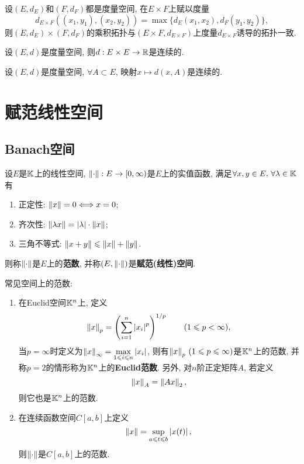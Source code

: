 	\begin{Remark}
	设$ (E,d_E) $和$ (F,d_F) $都是度量空间, 在$ E\times F $上赋以度量
	\[
	d_{E\times F}\left((x_1,y_1),(x_2,y_2)\right)=\max\{ d_E(x_1,x_2), d_F(y_1,y_2) \},
	\]
	则$ (E,d_E) \times (F,d_F) $的乘积拓扑与$ (E\times F, d_{E\times F}) $上度量$ d_{E\times F} $诱导的拓扑一致.
	\end{Remark}

	\begin{Proposition}
	设$ (E,d) $是度量空间, 则$ d : E\times E\to\mathbb{R} $是连续的.
	\end{Proposition}
	\begin{Corollary}\label{cor:距离函数连续}
	设$ (E,d) $是度量空间, $ \forall A\subset E $, 映射$ x\mapsto d(x,A) $是连续的.
	\end{Corollary}

\section{赋范线性空间}

	\subsection{Banach空间}

	\begin{Definition}[赋范空间]\label{def:赋范空间}
	设$ E $是$ \mathbb{K} $上的线性空间, $ \left\| \cdot \right\| : E\to[0,\infty) $是$ E $上的实值函数, 满足$ \forall x,y\in E,\,\forall\lambda\in\mathbb{K} $有

	\begin{enumerate}[(1)]
	\item 正定性: $ \left\| x \right\|=0\Longleftrightarrow x=0 $;

	\item 齐次性: $ \left\| \lambda x \right\|=\left| \lambda \right| \cdot\left\| x \right\| $;

	\item 三角不等式: $ \left\| x+y \right\|\leqslant\left\| x \right\|+\left\| y \right\| $.
	\end{enumerate}
	则称$ \left\| \cdot \right\| $是$ E $上的\textbf{范数}, 并称$ (E,\left\| \cdot \right\|) $是\textbf{赋范(线性)空间}.
	\end{Definition}

	\begin{Example}
	常见空间上的范数:

	\begin{enumerate}[(1)]
	\item 在Euclid空间$ \mathbb{K}^n $上, 定义
		\[
		\left\| x \right\|_p=\left(\sum_{i=1}^n\left| x_i \right| ^p\right)^{1/p}\qquad(1\leqslant p<\infty),
		\]
		当$ p=\infty $时定义为$ \left\| x \right\|_\infty=\max\limits_{1\leqslant i\leqslant n}\left| x_i \right|  $, 则有$ \left\| x \right\|_p\,(1\leqslant p\leqslant\infty) $是$ \mathbb{K}^n $上的范数, 并称$ p=2 $的情形称为$ \mathbb{K}^n $上的\textbf{Euclid范数}. 另外, 对$ n $阶正定矩阵$ A $, 若定义
		\[
		\left\| x \right\|_A=\left\| Ax \right\|_2,
		\]
		则它也是$ \mathbb{K}^n $上的范数.

	\item 在连续函数空间$ C[a,b] $上定义
	\[
	\left\| x \right\|=\sup_{a\leqslant t\leqslant b}\left| x(t) \right| ,
	\]
	则$ \left\| \cdot \right\| $是$ C[a,b] $上的范数.
	\end{enumerate}

	\end{Example}


